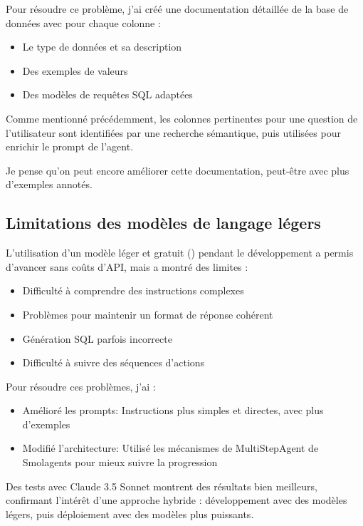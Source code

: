 \documentclass[a4paper,11pt]{article}
\begin{document}
Pour résoudre ce problème, j'ai créé une documentation détaillée de la base de données 
avec pour chaque colonne :
\begin{itemize}
\item Le type de données et sa description
\item Des exemples de valeurs
\item Des modèles de requêtes SQL adaptées
\end{itemize}

Comme mentionné précédemment, les colonnes pertinentes pour une question de l'utilisateur sont identifiées par une recherche sémantique, puis utilisées pour enrichir le prompt de l'agent. 

\vskip 0.1cm
Je pense qu'on peut encore améliorer cette documentation, peut-être avec plus d'exemples annotés.

\subsection{Limitations des modèles de langage légers}

L'utilisation d'un modèle léger et gratuit () pendant le développement a permis d'avancer sans coûts d'API, mais a montré des limites :
\begin{itemize}
\item Difficulté à comprendre des instructions complexes
\item Problèmes pour maintenir un format de réponse cohérent
\item Génération SQL parfois incorrecte
\item Difficulté à suivre des séquences d'actions
\end{itemize}

\vskip 0.1cm
Pour résoudre ces problèmes, j'ai :
\begin{itemize}
\item Amélioré les prompts: Instructions plus simples et directes, avec plus d'exemples
\item Modifié l'architecture: Utilisé les mécanismes de MultiStepAgent de Smolagents pour mieux suivre la progression
\end{itemize}

\vskip 0.1cm
Des tests avec Claude 3.5 Sonnet montrent des résultats bien meilleurs, confirmant l'intérêt d'une approche hybride : développement avec des modèles légers, puis déploiement avec des modèles plus puissants.
\end{document}

